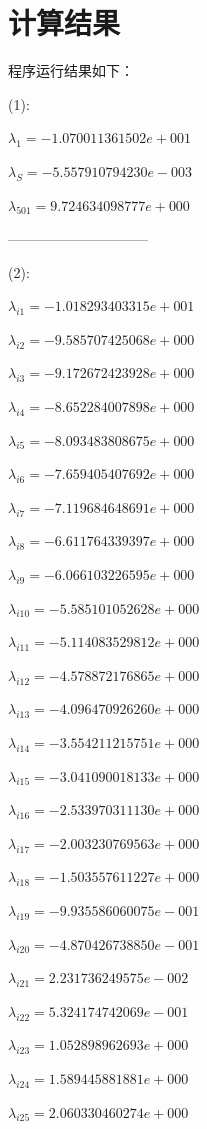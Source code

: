 \chapter{计算结果}
程序运行结果如下：

(1):

$\lambda_1=-1.070011361502e+001$

$\lambda_S=-5.557910794230e-003$

$\lambda_{501}=9.724634098777e+000$



------------------------------

(2):

$\lambda_{i1}=-1.018293403315e+001$

$\lambda_{i2}=-9.585707425068e+000$

$\lambda_{i3}=-9.172672423928e+000$

$\lambda_{i4}=-8.652284007898e+000$

$\lambda_{i5}=-8.093483808675e+000$

$\lambda_{i6}=-7.659405407692e+000$

$\lambda_{i7}=-7.119684648691e+000$

$\lambda_{i8}=-6.611764339397e+000$

$\lambda_{i9}=-6.066103226595e+000$

$\lambda_{i10}=-5.585101052628e+000$

$\lambda_{i11}=-5.114083529812e+000$

$\lambda_{i12}=-4.578872176865e+000$

$\lambda_{i13}=-4.096470926260e+000$

$\lambda_{i14}=-3.554211215751e+000$

$\lambda_{i15}=-3.041090018133e+000$

$\lambda_{i16}=-2.533970311130e+000$

$\lambda_{i17}=-2.003230769563e+000$

$\lambda_{i18}=-1.503557611227e+000$

$\lambda_{i19}=-9.935586060075e-001$

$\lambda_{i20}=-4.870426738850e-001$

$\lambda_{i21}=2.231736249575e-002$

$\lambda_{i22}=5.324174742069e-001$

$\lambda_{i23}=1.052898962693e+000$

$\lambda_{i24}=1.589445881881e+000$

$\lambda_{i25}=2.060330460274e+000$

